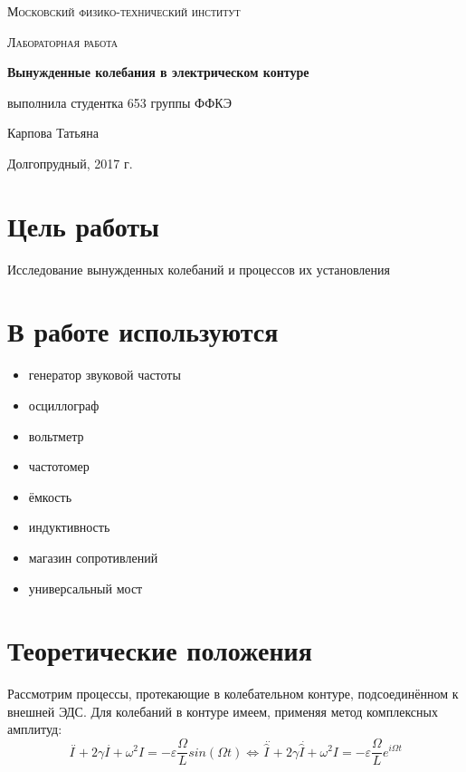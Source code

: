 \documentclass[a4paper]{article}
\begin{document}
\begin{titlepage}
	\centering
	\vspace{5cm}
	{\scshape\LARGE Московский физико-технический институт \par}
	\vspace{4cm}
	{\scshape\Large Лабораторная работа \par}
	\vspace{1cm}
	{\huge\bfseries Вынужденные колебания в электрическом контуре \par}
	\vspace{1cm}
	\vfill
\begin{flushright}
	{\large выполнила студентка 653 группы ФФКЭ}\par
	\vspace{0.3cm}
	{\LARGE Карпова Татьяна}
\end{flushright}
	

	\vfill

	Долгопрудный, 2017 г.
\end{titlepage}

\section{Цель работы}
Исследование вынужденных колебаний и процессов их установления

\section{В работе используются}
\begin{itemize}
    \item генератор звуковой частоты
    \item осциллограф
    \item вольтметр
    \item частотомер
    \item ёмкость
    \item индуктивность
    \item магазин сопротивлений
    \item универсальный мост
\end{itemize}

\section {Теоретические положения}

\par Рассмотрим процессы, протекающие в колебательном контуре, подсоединённом к внешней ЭДС. Для колебаний в контуре имеем, применяя метод комплексных амплитуд: 
$$ \overset{\,\,..}{I} + 2\gamma \overset{\,\,.}{I}+\omega^2 I = -\varepsilon \frac{\Omega}{L} sin (\Omega t)   \Leftrightarrow  \overset{ \,\,..}{\widehat{I}} + 2\gamma \overset{\,\,.}{\widehat{I} } + \omega^2 I = -\varepsilon \frac{\Omega}{L} e^{i\Omega t} $$
\end{document}
